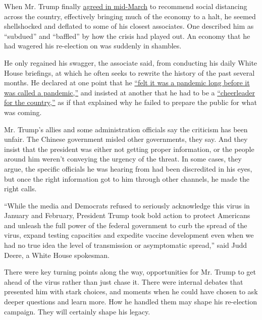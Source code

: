 When Mr. Trump finally
\href{https://www.nytimes.com/2020/03/16/health/coronavirus-social-distancing-crowd-size.html}{agreed
in mid-March} to recommend social distancing across the country,
effectively bringing much of the economy to a halt, he seemed
shellshocked and deflated to some of his closest associates. One
described him as ``subdued'' and ``baffled'' by how the crisis had
played out. An economy that he had wagered his re-election on was
suddenly in shambles.

He only regained his swagger, the associate said, from conducting his
daily White House briefings, at which he often seeks to rewrite the
history of the past several months. He declared at one point that he
\href{https://www.nytimes.com/2020/03/17/us/politics/trump-coronavirus.html}{``felt
it was a pandemic long before it was called a pandemic,''} and insisted
at another that he had to be a
\href{https://www.whitehouse.gov/briefings-statements/remarks-president-trump-vice-president-pence-members-coronavirus-task-force-press-briefing-15/}{``cheerleader
for the country,''} as if that explained why he failed to prepare the
public for what was coming.

Mr. Trump's allies and some administration officials say the criticism
has been unfair. The Chinese government misled other governments, they
say. And they insist that the president was either not getting proper
information, or the people around him weren't conveying the urgency of
the threat. In some cases, they argue, the specific officials he was
hearing from had been discredited in his eyes, but once the right
information got to him through other channels, he made the right calls.

``While the media and Democrats refused to seriously acknowledge this
virus in January and February, President Trump took bold action to
protect Americans and unleash the full power of the federal government
to curb the spread of the virus, expand testing capacities and expedite
vaccine development even when we had no true idea the level of
transmission or asymptomatic spread,'' said Judd Deere, a White House
spokesman.

There were key turning points along the way, opportunities for Mr. Trump
to get ahead of the virus rather than just chase it. There were internal
debates that presented him with stark choices, and moments when he could
have chosen to ask deeper questions and learn more. How he handled them
may shape his re-election campaign. They will certainly shape his
legacy.

